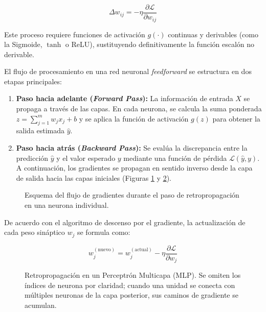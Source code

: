 \begin{equation}
    \Delta w_{ij} = -\eta \frac{\partial \mathcal{L}}{\partial w_{ij}}
    \label{eq:deltaW}
\end{equation}

Este proceso requiere funciones de activación $g(\cdot)$ continuas y derivables (como la Sigmoide, $\tanh$ o ReLU), sustituyendo definitivamente la función escalón no derivable.

El flujo de procesamiento en una red neuronal \textit{feedforward} se estructura en dos etapas principales:
\begin{enumerate}
    \item \textbf{Paso hacia adelante (\textit{Forward Pass}):} La información de entrada $X$ se propaga a través de las capas. En cada neurona, se calcula la suma ponderada $z = \sum_{j=1}^{m} w_j x_j + b$ y se aplica la función de activación $g(z)$ para obtener la salida estimada $\hat{y}$.
    \item \textbf{Paso hacia atrás (\textit{Backward Pass}):} Se evalúa la discrepancia entre la predicción $\hat{y}$ y el valor esperado $y$ mediante una función de pérdida $\mathcal{L}(\hat{y}, y)$. A continuación, los gradientes se propagan en sentido inverso desde la capa de salida hacia las capas iniciales (Figuras \ref{fig:backpropagation} y \ref{fig:backpropagation_mlp}).
\end{enumerate}

\begin{figure}[H]
    \centering
    \resizebox{0.95\textwidth}{!}{%
    }%
    \caption{Esquema del flujo de gradientes durante el paso de retropropagación en una neurona individual.}
    \label{fig:backpropagation}
\end{figure}

De acuerdo con el algoritmo de descenso por el gradiente, la actualización de cada peso sináptico $w_j$ se formula como:

\begin{equation}
    w_j^{(\text{nuevo})} = w_j^{(\text{actual})} - \eta \frac{\partial \mathcal{L}}{\partial w_j}
\end{equation}

\begin{figure}[H]
    \centering
    \resizebox{0.95\textwidth}{!}{%
    }%
    \caption{Retropropagación en un Perceptrón Multicapa (MLP). Se omiten los índices de neurona por claridad; cuando una unidad se conecta con múltiples neuronas de la capa posterior, sus caminos de gradiente se acumulan.}
    \label{fig:backpropagation_mlp}
\end{figure}

